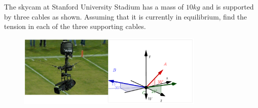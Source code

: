 
The skycam at Stanford University Stadium has a mass of $10 kg$ and is supported by three cables as shown. Assuming that it is currently in equilibrium, find the tension in each of the three supporting cables.

\begin{figure}[ht!]
  \centering
  \includegraphics[width=0.8\textwidth,height=0.5\textheight,keepaspectratio]{fig-qz.png}
\end{figure}

